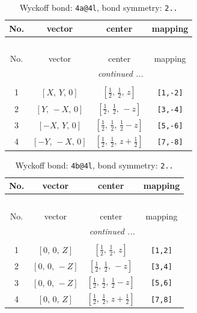 \documentclass[fleqn,8pt]{jsarticle}
\begin{document}
\begin{longtable}{cccc}
\caption{Wyckoff bond: {\tt 4a@4l}, bond symmetry: {\tt 2..}}
 \\
 \hline \hline
No. & vector & center & mapping \\ \hline \endfirsthead

\multicolumn{3}{l}{\tablename\ \thetable{}} \\
 \hline \hline
No. & vector & center & mapping \\ \hline \endhead

 \hline \hline
\multicolumn{3}{r}{\footnotesize\it continued ...} \\ \endfoot

 \hline \hline
\multicolumn{3}{r}{} \\ \endlastfoot

1 & $\left[ X,\, Y,\, 0 \right]$ & $\left[ \frac{1}{2},\, \frac{1}{2},\, z \right]$ & {\tt [1,-2]} \\ \hline
2 & $\left[ Y,\, - X,\, 0 \right]$ & $\left[ \frac{1}{2},\, \frac{1}{2},\, - z \right]$ & {\tt [3,-4]} \\ \hline
3 & $\left[ - X,\, Y,\, 0 \right]$ & $\left[ \frac{1}{2},\, \frac{1}{2},\, \frac{1}{2} - z \right]$ & {\tt [5,-6]} \\ \hline
4 & $\left[ - Y,\, - X,\, 0 \right]$ & $\left[ \frac{1}{2},\, \frac{1}{2},\, z + \frac{1}{2} \right]$ & {\tt [7,-8]} \\
\end{longtable}
\renewcommand{\arraystretch}{1.2}
\begin{longtable}{cccc}
\caption{Wyckoff bond: {\tt 4b@4l}, bond symmetry: {\tt 2..}}
 \\
 \hline \hline
No. & vector & center & mapping \\ \hline \endfirsthead

\multicolumn{3}{l}{\tablename\ \thetable{}} \\
 \hline \hline
No. & vector & center & mapping \\ \hline \endhead

 \hline \hline
\multicolumn{3}{r}{\footnotesize\it continued ...} \\ \endfoot

 \hline \hline
\multicolumn{3}{r}{} \\ \endlastfoot

1 & $\left[ 0,\, 0,\, Z \right]$ & $\left[ \frac{1}{2},\, \frac{1}{2},\, z \right]$ & {\tt [1,2]} \\ \hline
2 & $\left[ 0,\, 0,\, - Z \right]$ & $\left[ \frac{1}{2},\, \frac{1}{2},\, - z \right]$ & {\tt [3,4]} \\ \hline
3 & $\left[ 0,\, 0,\, - Z \right]$ & $\left[ \frac{1}{2},\, \frac{1}{2},\, \frac{1}{2} - z \right]$ & {\tt [5,6]} \\ \hline
4 & $\left[ 0,\, 0,\, Z \right]$ & $\left[ \frac{1}{2},\, \frac{1}{2},\, z + \frac{1}{2} \right]$ & {\tt [7,8]} \\
\end{longtable}
\end{document}
